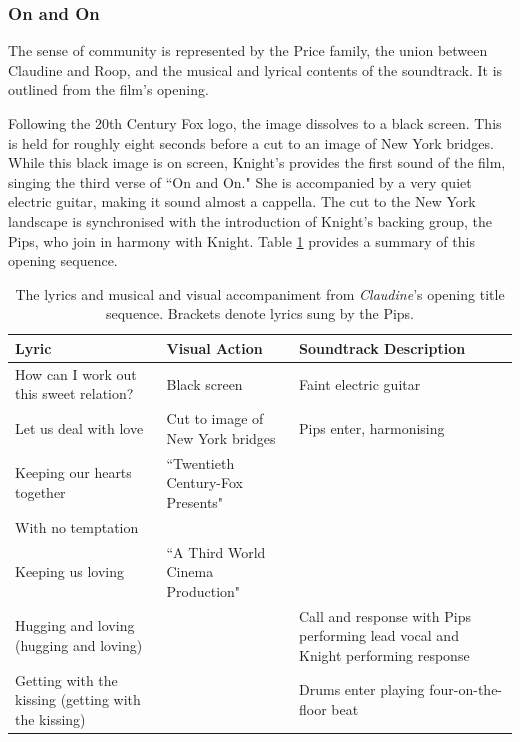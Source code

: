 \subsubsection{On and On}

The sense of community is represented by the Price family, the union between Claudine and Roop, and the musical and lyrical contents of the soundtrack.
It is outlined from the film's opening.

Following the 20th Century Fox logo, the image dissolves to a black screen.
This is held for roughly eight seconds before a cut to an image of New York bridges.
While this black image is on screen, Knight's provides the first sound of the film, singing the third verse of ``On and On." 
She is accompanied by a very quiet electric guitar, making it sound almost a cappella.
The cut to the New York landscape is synchronised with the introduction of Knight's backing group, the Pips, who join in harmony with Knight.
Table \ref{tab:claudine-on-opening} provides a summary of this opening sequence.


\begin{table}[h]
    \centering
    \begin{tabular}{p{50mm} >{\raggedright\arraybackslash}p{50mm}p{50mm} }\toprule
         Lyric&   Visual Action&Soundtrack Description\\\midrule
         How can I work out this sweet relation?&   Black screen&Faint electric guitar\\
         Let us deal with love&   Cut to image of New York bridges&Pips enter, harmonising\\
         Keeping our hearts together&   ``Twentieth Century-Fox Presents"&\\
         With no temptation&   &\\
         Keeping us loving&   ``A Third World Cinema Production"&\\
 Hugging and loving (hugging and loving)&  &Call and response with Pips performing lead vocal and Knight performing response\\
 Getting with the kissing (getting with the kissing)&  &Drums enter playing four-on-the-floor beat\\ \bottomrule
    \end{tabular}
\caption{The lyrics and musical and visual accompaniment from \textit{Claudine}'s opening title sequence. Brackets denote lyrics sung by the Pips.}
\label{tab:claudine-on-opening}
    
    
\end{table}


